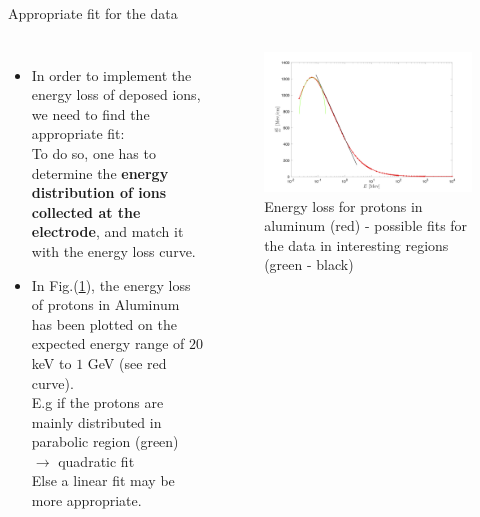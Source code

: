 \documentclass[aspectratio=169,xcolor=dvipsnames,8pt]{beamer}
\begin{document}
 \begin{frame}{Appropriate fit for the data}
     \begin{columns}[c] %

	\begin{itemize}


		\item{In order to implement the energy loss of deposed ions, we need to find the appropriate fit:\\
		To do so, one has to determine the \textbf{energy distribution of ions collected at the electrode}, and match it with the energy loss curve.
		}
		\item{In Fig.(\ref{fig2}), the energy loss of protons in Aluminum has been plotted on the expected energy range of $20$ keV to $1$ GeV (see red curve).\\
		E.g if the protons are mainly distributed in parabolic region (green) $\rightarrow$ quadratic fit\\
		Else a linear fit may be more appropriate.
		}
				
						
	\end{itemize}

		\begin{figure}[h!]
		\includegraphics[width=1 \textwidth]{fit.png}
		\caption{\label{fig2} Energy loss for protons in aluminum (red) - possible fits for the data in interesting regions (green - black)}
		\end{figure}
     \end{columns}
\end{frame}
\end{document}
